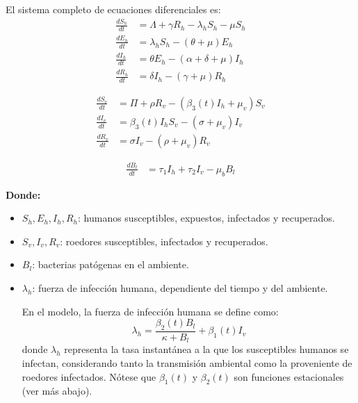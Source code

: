 \documentclass[12pt,a4paper]{article}
\begin{document}
El sistema completo de ecuaciones diferenciales es:
\begin{align*}
\frac{dS_h}{dt} &= \Lambda + \gamma R_h - \lambda_h S_h - \mu S_h \\
\frac{dE_h}{dt} &= \lambda_h S_h - (\theta + \mu) E_h \\
\frac{dI_h}{dt} &= \theta E_h - (\alpha + \delta + \mu) I_h \\
\frac{dR_h}{dt} &= \delta I_h - (\gamma + \mu) R_h
\end{align*}

\begin{align*}
\frac{dS_v}{dt} &= \Pi + \rho R_v - (\beta_3(t) I_h + \mu_v) S_v \\
\frac{dI_v}{dt} &= \beta_3(t) I_h S_v - (\sigma + \mu_v) I_v \\
\frac{dR_v}{dt} &= \sigma I_v - (\rho + \mu_v) R_v
\end{align*}

\begin{align*}
\frac{dB_l}{dt} &= \tau_1 I_h + \tau_2 I_v - \mu_b B_l
\end{align*}

\textbf{Donde:}
\begin{itemize}
    \item $S_h, E_h, I_h, R_h$: humanos susceptibles, expuestos, infectados y recuperados.
    \item $S_v, I_v, R_v$: roedores susceptibles, infectados y recuperados.
    \item $B_l$: bacterias patógenas en el ambiente.
    \item $\lambda_h$: fuerza de infección humana, dependiente del tiempo y del ambiente.

    En el modelo, la fuerza de infección humana se define como:
    \[
    \lambda_h = \frac{\beta_2(t) B_l}{\kappa + B_l} + \beta_1(t) I_v
    \]
    donde $\lambda_h$ representa la tasa instantánea a la que los susceptibles humanos se infectan, considerando tanto la transmisión ambiental como la proveniente de roedores infectados. Nótese que $\beta_1(t)$ y $\beta_2(t)$ son funciones estacionales (ver más abajo).
\end{itemize}
\end{document}
